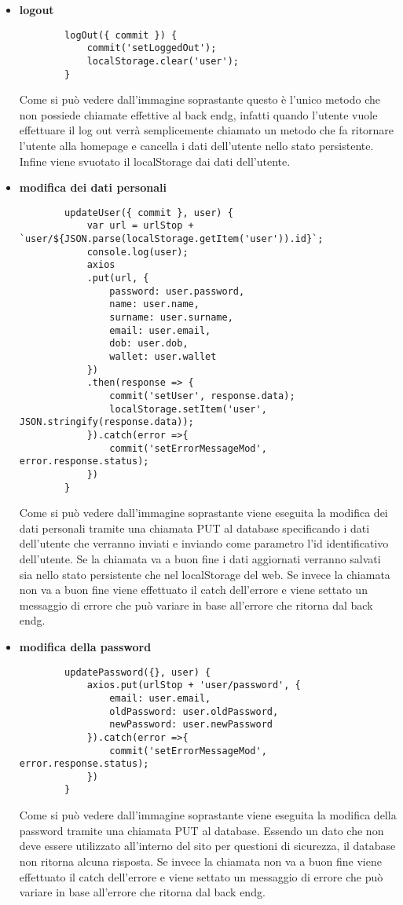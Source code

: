 \begin{itemize}
	\item \textbf{logout}
	\begin{lstlisting}
		logOut({ commit }) {
			commit('setLoggedOut');
			localStorage.clear('user');
		}
	\end{lstlisting}
	Come si può vedere dall'immagine soprastante questo è l'unico metodo che non possiede chiamate effettive al \gls{back endg}, infatti quando l'utente vuole effettuare il log out verrà semplicemente chiamato un metodo che fa ritornare l'utente alla homepage e cancella i dati dell'utente nello stato persistente. Infine viene svuotato il localStorage dai dati dell'utente.
	\item \textbf{modifica dei dati personali}
	\begin{lstlisting}
		updateUser({ commit }, user) {
			var url = urlStop + `user/${JSON.parse(localStorage.getItem('user')).id}`;
			console.log(user);
			axios
			.put(url, {
				password: user.password,
				name: user.name,
				surname: user.surname,
				email: user.email,
				dob: user.dob,
				wallet: user.wallet
			})
			.then(response => {
				commit('setUser', response.data);
				localStorage.setItem('user', JSON.stringify(response.data));
			}).catch(error =>{
				commit('setErrorMessageMod', error.response.status);
			})
		}
	\end{lstlisting}
	Come si può vedere dall'immagine soprastante viene eseguita la modifica dei dati personali tramite una chiamata PUT al database specificando i dati dell'utente che verranno inviati e inviando come parametro l'id identificativo dell'utente. Se la chiamata va a buon fine i dati aggiornati verranno salvati sia nello stato persistente che nel localStorage del web. Se invece  la chiamata non va a buon fine viene effettuato il catch dell'errore e viene settato un messaggio di errore che può variare in base all'errore che ritorna dal \gls{back endg}.
	\item \textbf{modifica della password}
	\begin{lstlisting}
		updatePassword({}, user) {
			axios.put(urlStop + 'user/password', {
				email: user.email,
				oldPassword: user.oldPassword,
				newPassword: user.newPassword
			}).catch(error =>{
				commit('setErrorMessageMod', error.response.status);
			})
		}
	\end{lstlisting}
	Come si può vedere dall'immagine soprastante viene eseguita la modifica della password tramite una chiamata PUT al database. Essendo un dato che non deve essere utilizzato all'interno del sito per questioni di sicurezza, il database non ritorna alcuna risposta. Se invece  la chiamata non va a buon fine viene effettuato il catch dell'errore e viene settato un messaggio di errore che può variare in base all'errore che ritorna dal \gls{back endg}.
\end{itemize}

